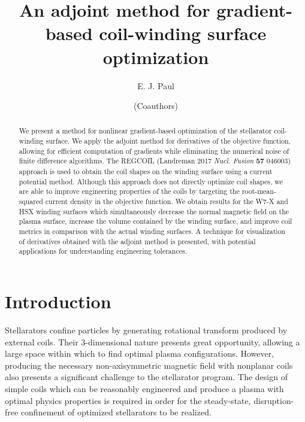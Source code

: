 \documentclass[aps,unsortedaddress]{revtex4-1}
\begin{document}
\title{An adjoint method for gradient-based coil-winding surface optimization}
\author{E. J. Paul}

\author{(Coauthors)}

\begin{abstract}
We present a method for nonlinear gradient-based optimization of the stellarator coil-winding surface. We apply the adjoint method for derivatives of the objective function, allowing for efficient computation of gradients while eliminating the numerical noise of finite difference algorithms. The REGCOIL (Landreman 2017 \textit{Nucl. Fusion} \textbf{57} 046003) approach is used to obtain the coil shapes on the winding surface using a current potential method. Although this approach does not directly optimize coil shapes, we are able to improve engineering properties of the coils by targeting the root-mean-squared current density in the objective function. We obtain results for the W7-X and HSX winding surfaces which simultaneously decrease the normal magnetic field on the plasma surface,  increase the volume contained by the winding surface, and improve coil metrics in comparison with the actual winding surfaces. A technique for visualization of derivatives obtained with the adjoint method is presented, with potential applications for understanding engineering tolerances. 
\end{abstract}

\maketitle

\section{Introduction}

Stellarators confine particles by generating rotational transform produced by external coils. Their 3-dimensional nature presents great opportunity, allowing a large space within which to find optimal plasma configurations. However, producing the necessary non-axisymmetric magnetic field with nonplanar coils also presents a significant challenge to the stellarator program. The design of simple coils which can be reasonably engineered and produce a plasma with optimal physics properties is required in order for the steady-state, disruption-free confinement of optimized stellarators to be realized. 
\end{document}
